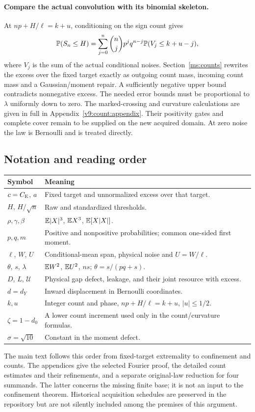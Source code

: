 \paragraph{Compare the actual convolution with its binomial skeleton.}
At $np+H/\ell=k+u$, conditioning on the sign count gives
\[
 \mathbb P(S_n\le H)=\sum_{j=0}^n\binom njp^jq^{n-j}
                    \mathbb P(V_j\le k+u-j),
\]
where $V_j$ is the sum of the actual conditional noises.
Section~\ref{ms:counts} rewrites the excess over the fixed target exactly
as outgoing count mass, incoming count mass and a Gaussian/moment repair.
A sufficiently negative upper bound contradicts nonnegative excess.
The needed error bounds must be proportional to $\lambda$ uniformly down
to zero. The marked-crossing and curvature calculations are given in full
in Appendix~\ref{v9:count:appendix}. Their positivity gates and complete
cover remain to be supplied on the new acquired domain. At zero noise
the law is Bernoulli and is treated directly.

\subsection{Notation and reading order}\label{ms:notation}
\begin{center}\small
\begin{tabular}{@{}lP{108mm}@{}}\toprule
Symbol & Meaning\\\midrule
$c=C_{\mathrm E}$, $a$ & Fixed target and unnormalized excess over that target.\\
$H$, $H/\sqrt n$ & Raw and standardized thresholds.\\
$\rho,\gamma,\beta$ & $\mathbb E|X|^3$, $\mathbb E X^3$, $\mathbb E[X|X|]$.\\
$p,q,m$ & Positive and nonpositive probabilities; common one-sided first moment.\\
$\ell$, $W$, $U$ & Conditional-mean span, physical noise and $U=W/\ell$.\\
$\theta$, $s$, $\lambda$ & $\mathbb E W^2$, $\mathbb E U^2$, $ns$; $\theta=s/(pq+s)$.\\
$D$, $L$, $\mathcal U$ & Physical gap defect, leakage, and their joint resource with excess.\\
$d=d_Y$ & Inward displacement in Bernoulli coordinates.\\
$k,u$ & Integer count and phase, $np+H/\ell=k+u$, $|u|\le1/2$.\\
$\zeta=1-d_0$ & A lower count increment used only in the count/curvature formulas.\\
$\sigma=\sqrt{10}$ & Constant in the moment defect.\\\bottomrule
\end{tabular}
\end{center}

The main text follows this order from fixed-target extremality to
confinement and counts. The appendices give the selected Fourier proof,
the detailed count estimates and their refinements, and a separate
original-law reduction for four summands. The latter concerns the missing
finite base; it is not an input to the confinement theorem. Historical
acquisition schedules are preserved in the repository but are not silently
included among the premises of this argument.
